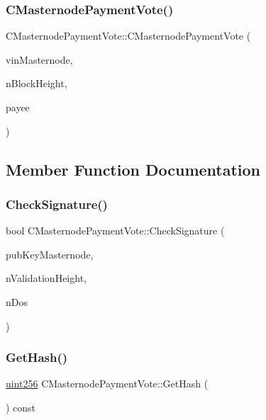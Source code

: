 \subsubsection{\texorpdfstring{C\+Masternode\+Payment\+Vote()}{CMasternodePaymentVote()}\hspace{0.1cm}{\footnotesize\ttfamily [2/2]}}
{\footnotesize\ttfamily C\+Masternode\+Payment\+Vote\+::\+C\+Masternode\+Payment\+Vote (\begin{DoxyParamCaption}\item[{C\+Tx\+In}]{vin\+Masternode,  }\item[{int}]{n\+Block\+Height,  }\item[{C\+Script}]{payee }\end{DoxyParamCaption})\hspace{0.3cm}{\ttfamily [inline]}}



\subsection{Member Function Documentation}
\mbox{\label{class_c_masternode_payment_vote_a07da3b083404cef1b60ed8b1305e4f0c}} 
\subsubsection{\texorpdfstring{Check\+Signature()}{CheckSignature()}}
{\footnotesize\ttfamily bool C\+Masternode\+Payment\+Vote\+::\+Check\+Signature (\begin{DoxyParamCaption}\item[{const \mbox{\hyperlink{class_c_pub_key}{C\+Pub\+Key}} \&}]{pub\+Key\+Masternode,  }\item[{int}]{n\+Validation\+Height,  }\item[{int \&}]{n\+Dos }\end{DoxyParamCaption})}

\mbox{\label{class_c_masternode_payment_vote_ac9dc15bcd8554151de83079ca0b65696}} 
\subsubsection{\texorpdfstring{Get\+Hash()}{GetHash()}}
{\footnotesize\ttfamily \mbox{\hyperlink{classuint256}{uint256}} C\+Masternode\+Payment\+Vote\+::\+Get\+Hash (\begin{DoxyParamCaption}{ }\end{DoxyParamCaption}) const\hspace{0.3cm}{\ttfamily [inline]}}


